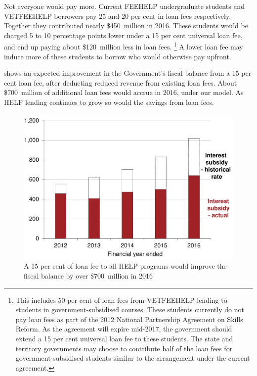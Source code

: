 \documentclass[embargoed]{grattan}
\begin{document}
Not everyone would pay more.
Current \gls{FEEHELP} undergraduate students and \gls{VETFEEHELP} borrowers pay 25 and 20 per cent in loan fees respectively.
Together they contributed nearly \$450~million in 2016.
These students would be charged 5 to 10 percentage points lower under a 15 per cent universal loan fee, and end up paying about \$120~million less in loan fees.%
\footnote{This includes 50 per cent of loan fees from \gls{VETFEEHELP} lending to students in government-subsidised courses.
These students currently do not pay loan fees as part of the 2012 National Partnership Agreement on Skills Reform.
As the agreement will expire mid-2017, the government should extend a 15 per cent universal loan fee to these students.
The state and territory governments may choose to contribute half of the loan fees for government-subsidised students similar to the arrangement under the current agreement.} A lower loan fee may induce more of these students to borrow who would otherwise pay upfront.

 shows an expected improvement in the Government's fiscal balance from a 15 per cent loan fee, after deducting reduced revenue from existing loan fees.
About \$700~million of additional loan fees would accrue in 2016, under our model.
As \gls{HELP} lending continues to grow so would the savings from loan fees.

\begin{figure}
\caption[A 15 per cent of loan fee to all {HELP} programs would improve the fiscal balance by over \$700~million in 2016]{A 15 per cent of loan fee to all \gls{HELP} programs would improve the fiscal balance by over \$700~million in 2016}\label{fig:fig24-a-15pc-loan-fee-all-HELP-progs-would-improve-fisc-bal-by-over-700M-in-2016}


\includegraphics[page=24]{atlas/Chartpack.pdf}

\end{figure}
\glsaddall
\printglossaries
\printbibliography
\end{document}
